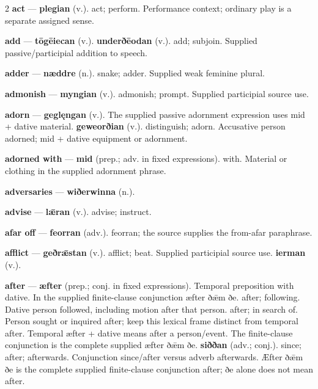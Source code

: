 \begin{multicols}{2}
\textbf{act} — \textbf{plegian} (v.). act; perform. Performance context; ordinary play is a separate assigned sense.\par
\textbf{add} — \textbf{tōgēiecan} (v.).  \textbf{underðēodan} (v.). add; subjoin. Supplied passive/participial addition to speech.\par
\textbf{adder} — \textbf{næddre} (n.). snake; adder. Supplied weak feminine plural.\par
\textbf{admonish} — \textbf{myngian} (v.). admonish; prompt. Supplied participial source use.\par
\textbf{adorn} — \textbf{geglęngan} (v.). The supplied passive adornment expression uses mid + dative material. \textbf{geweorðian} (v.). distinguish; adorn. Accusative person adorned; mid + dative equipment or adornment.\par
\textbf{adorned with} — \textbf{mid} (prep.; adv. in fixed expressions). with. Material or clothing in the supplied adornment phrase.\par
\textbf{adversaries} — \textbf{wiðerwinna} (n.).\par
\textbf{advise} — \textbf{lǣran} (v.). advise; instruct.\par
\textbf{afar off} — \textbf{feorran} (adv.). feorran; the source supplies the from-afar paraphrase.\par
\textbf{afflict} — \textbf{geðrǣstan} (v.). afflict; beat. Supplied participial source use. \textbf{ierman} (v.).\par
\textbf{after} — \textbf{æfter} (prep.; conj. in fixed expressions). Temporal preposition with dative. In the supplied finite-clause conjunction æfter ðǣm ðe. after; following. Dative person followed, including motion after that person. after; in search of. Person sought or inquired after; keep this lexical frame distinct from temporal after. Temporal æfter + dative means after a person/event. The finite-clause conjunction is the complete supplied æfter ðǣm ðe. \textbf{siððan} (adv.; conj.). since; after; afterwards. Conjunction since/after versus adverb afterwards. Æfter ðǣm ðe is the complete supplied finite-clause conjunction after; ðe alone does not mean after.\par

\end{multicols}
